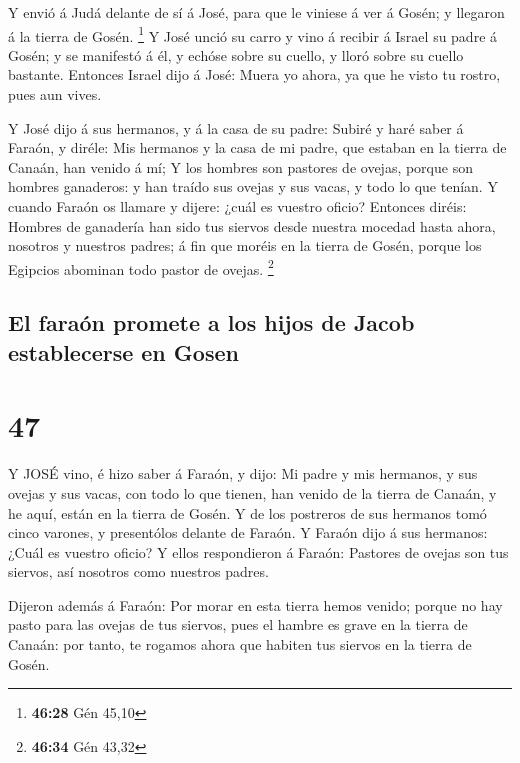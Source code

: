  Y envió á Judá delante de sí á José, para que le viniese á
ver á Gosén; y llegaron á la tierra de Gosén. \footnote{\textbf{46:28}
  Gén 45,10}  Y José unció su carro y vino á recibir á
Israel su padre á Gosén; y se manifestó á él, y echóse sobre su cuello,
y lloró sobre su cuello bastante.  Entonces Israel dijo á
José: Muera yo ahora, ya que he visto tu rostro, pues aun vives.

 Y José dijo á sus hermanos, y á la casa de su padre:
Subiré y haré saber á Faraón, y diréle: Mis hermanos y la casa de mi
padre, que estaban en la tierra de Canaán, han venido á mí;
 Y los hombres son pastores de ovejas, porque son hombres
ganaderos: y han traído sus ovejas y sus vacas, y todo lo que tenían.
 Y cuando Faraón os llamare y dijere: ¿cuál es vuestro
oficio?  Entonces diréis: Hombres de ganadería han sido tus
siervos desde nuestra mocedad hasta ahora, nosotros y nuestros padres; á
fin que moréis en la tierra de Gosén, porque los Egipcios abominan todo
pastor de ovejas. \footnote{\textbf{46:34} Gén 43,32}

\hypertarget{el-farauxf3n-promete-a-los-hijos-de-jacob-establecerse-en-gosen}{%
\subsection{El faraón promete a los hijos de Jacob establecerse en
Gosen}\label{el-farauxf3n-promete-a-los-hijos-de-jacob-establecerse-en-gosen}}

\hypertarget{section-46}{%
\section{47}\label{section-46}}

 Y JOSÉ vino, é hizo saber á Faraón, y dijo: Mi padre y mis
hermanos, y sus ovejas y sus vacas, con todo lo que tienen, han venido
de la tierra de Canaán, y he aquí, están en la tierra de Gosén.
 Y de los postreros de sus hermanos tomó cinco varones, y
presentólos delante de Faraón.  Y Faraón dijo á sus
hermanos: ¿Cuál es vuestro oficio? Y ellos respondieron á Faraón:
Pastores de ovejas son tus siervos, así nosotros como nuestros padres.

 Dijeron además á Faraón: Por morar en esta tierra hemos
venido; porque no hay pasto para las ovejas de tus siervos, pues el
hambre es grave en la tierra de Canaán: por tanto, te rogamos ahora que
habiten tus siervos en la tierra de Gosén.

